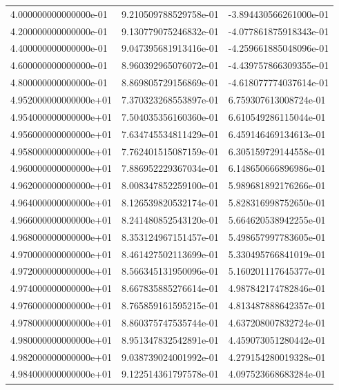 \documentclass[pdf,color]{UoBnote}
\begin{document}
\begin{table}[H]
{\begin{tabular}{l|l|l}
    4.000000000000000e-01 & 9.210509788529758e-01 & -3.894430566261000e-01 \\
    4.200000000000000e-01 & 9.130779075246832e-01 & -4.077861875918343e-01 \\
    4.400000000000000e-01 & 9.047395681913416e-01 & -4.259661885048096e-01 \\
    4.600000000000000e-01 & 8.960392965076072e-01 & -4.439757866309355e-01 \\
    4.800000000000000e-01 & 8.869805729156869e-01 & -4.618077774037614e-01 \\
    \hline\hline
    4.952000000000000e+01 & 7.370323268553897e-01 & 6.759307613008724e-01  \\
    4.954000000000000e+01 & 7.504035356160360e-01 & 6.610549286115044e-01  \\
    4.956000000000000e+01 & 7.634745534811429e-01 & 6.459146469134613e-01  \\
    4.958000000000000e+01 & 7.762401515087159e-01 & 6.305159729144558e-01  \\
    4.960000000000000e+01 & 7.886952229367034e-01 & 6.148650666896986e-01  \\
    4.962000000000000e+01 & 8.008347852259100e-01 & 5.989681892176266e-01  \\
    4.964000000000000e+01 & 8.126539820532174e-01 & 5.828316998752650e-01  \\
    4.966000000000000e+01 & 8.241480852543120e-01 & 5.664620538942255e-01  \\
    4.968000000000000e+01 & 8.353124967151457e-01 & 5.498657997783605e-01  \\
    4.970000000000000e+01 & 8.461427502113699e-01 & 5.330495766841019e-01  \\
    4.972000000000000e+01 & 8.566345131950096e-01 & 5.160201117645377e-01  \\
    4.974000000000000e+01 & 8.667835885276614e-01 & 4.987842174782846e-01  \\
    4.976000000000000e+01 & 8.765859161595215e-01 & 4.813487888642357e-01  \\
    4.978000000000000e+01 & 8.860375747535744e-01 & 4.637208007832724e-01  \\
    4.980000000000000e+01 & 8.951347832542891e-01 & 4.459073051280442e-01  \\
    4.982000000000000e+01 & 9.038739024001992e-01 & 4.279154280019328e-01  \\
    4.984000000000000e+01 & 9.122514361797578e-01 & 4.097523668683284e-01  \\

\end{tabular}}
\end{table}
\end{document}

